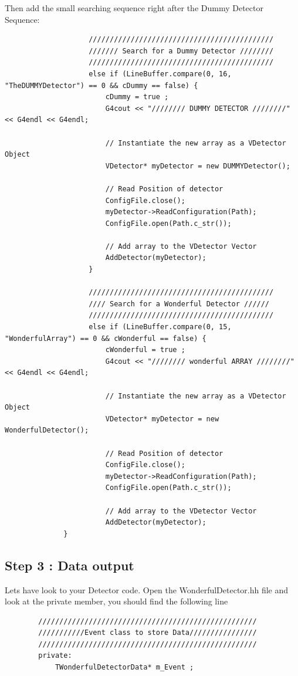 \documentclass{book}
\begin{document}
	Then add the small searching sequence right after the Dummy Detector Sequence:
			
	\begin{verbatim}
					////////////////////////////////////////////
					/////// Search for a Dummy Detector ////////
					////////////////////////////////////////////
					else if (LineBuffer.compare(0, 16, "TheDUMMYDetector") == 0 && cDummy == false) {
						cDummy = true ;
						G4cout << "//////// DUMMY DETECTOR ////////" << G4endl << G4endl;

						// Instantiate the new array as a VDetector Object
						VDetector* myDetector = new DUMMYDetector();

						// Read Position of detector
						ConfigFile.close();
						myDetector->ReadConfiguration(Path);
						ConfigFile.open(Path.c_str());

						// Add array to the VDetector Vector
						AddDetector(myDetector);
					}

					////////////////////////////////////////////
					//// Search for a Wonderful Detector //////
					////////////////////////////////////////////
					else if (LineBuffer.compare(0, 15, "WonderfulArray") == 0 && cWonderful == false) {
						cWonderful = true ;
						G4cout << "//////// wonderful ARRAY ////////" << G4endl << G4endl;

						// Instantiate the new array as a VDetector Object
						VDetector* myDetector = new WonderfulDetector();

						// Read Position of detector
						ConfigFile.close();
						myDetector->ReadConfiguration(Path);
						ConfigFile.open(Path.c_str());

						// Add array to the VDetector Vector
						AddDetector(myDetector);
		      }
	\end{verbatim}

	\subsection{Step 3 : Data output}

	Lets have look to your Detector code. Open the WonderfulDetector.hh file and look at the private member, you should find the following line

	\begin{verbatim}
		////////////////////////////////////////////////////
		///////////Event class to store Data////////////////
		////////////////////////////////////////////////////
		private:
			TWonderfulDetectorData* m_Event ;

	\end{verbatim}
\end{document}
